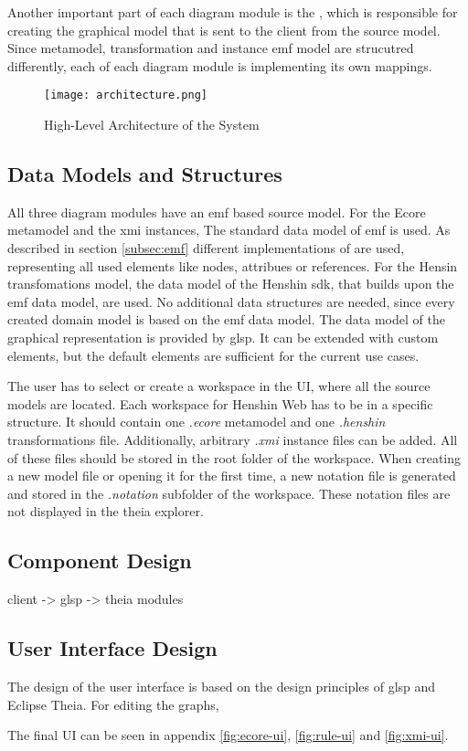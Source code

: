   Another important part of each diagram module is the , which is responsible for creating the graphical model that is sent to the client from the source model. Since metamodel, transformation and instance \ac{emf} model are strucutred differently, each  of each diagram module is implementing its own mappings.

  \begin{figure}
    \centering
    \texttt{[image: architecture.png]}
    \caption{High-Level Architecture of the System}
    \label{fig:architecture}
  \end{figure}

  \subsection{Data Models and Structures}
  \label{subsec:data-models}

  All three diagram modules have an \ac{emf} based source model. For the Ecore metamodel and the \ac{xmi} instances, The standard data model of \ac{emf} is used. As described in section \ref{subsec:emf} different implementations of  are used, representing all used elements like nodes, attribues or references. For the Hensin transfomations model, the data model of the Henshin \ac{sdk}, that builds upon the \ac{emf} data model, are used. No additional data structures are needed, since every created domain model is based on the \ac{emf} data model. The data model of the graphical representation is provided by \ac{glsp}. It can be extended with custom elements, but the default elements are sufficient for the current use cases. 

  The user has to select or create a workspace in the UI, where all the source models are located. Each workspace for Henshin Web has to be in a specific structure. It should contain one \textit{.ecore} metamodel and one \textit{.henshin} transformations file. Additionally, arbitrary \textit{.xmi} instance files can be added. All of these files should be stored in the root folder of the workspace. When creating a new model file or opening it for the first time, a new notation file is generated and stored in the \textit{.notation} subfolder of the workspace. These notation files are not displayed in the theia explorer.  

  \subsection{Component Design}
  \label{subsec:component-design}

  client -> glsp -> theia modules

  \subsection{User Interface Design}
  \label{subsec:user-interface-design}

  The design of the user interface is based on the design principles of \ac{glsp} and Eclipse Theia. For editing the graphs, 

  The final UI can be seen in appendix \ref{fig:ecore-ui}, \ref{fig:rule-ui} and \ref{fig:xmi-ui}.

